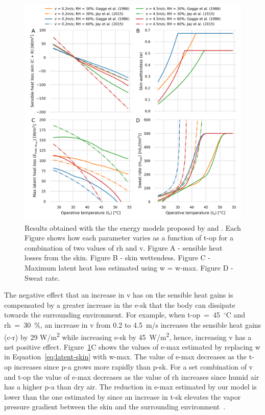 \begin{figure}[thb!]
    \centering
    \includegraphics[width=\textwidth]{figures/comparison_models_v2.png}
    \caption{Results obtained with the the energy models proposed by  and .
    Each Figure shows how each parameter varies as a function of \ac{t-op} for a combination of two values of \ac{rh} and \ac{v}.
    Figure A - sensible heat losses from the skin.
    Figure B - skin wettendess.
    Figure C - Maximum latent heat loss estimated using \ac{w} = \ac{w-max}.
    Figure D - Sweat rate.}
    \label{fig:comparison_models}
\end{figure}

The negative effect that an increase in \ac{v} has on the sensible heat gains is compensated by a greater increase in the \acf{e-sk} that the body can dissipate towards the surrounding environment.
For example, when \ac{t-op}~=~45~$^{\circ}$C and \ac{rh}~=~30~\%, an increase in \ac{v} from 0.2 to 4.5~m/s increases the sensible heat gains (\acs{c-r}) by 29 W/m\textsuperscript{2} while increasing \ac{e-sk} by 45~W/m\textsuperscript{2}, hence, increasing \ac{v} has a net positive effect.
Figure~\ref{fig:comparison_models}C shows the values of \ac{e-max} estimated by replacing \ac{w} in Equation~\ref{eq:latent-skin} with \ac{w-max}.
The value of \ac{e-max} decreases as the \ac{t-op} increases since \ac{p-a} grows more rapidly than \ac{p-sk}.
For a set combination of \ac{v} and \ac{t-op} the value of \ac{e-max} decreases as the value of \ac{rh} increases since humid air has a higher \ac{p-a} than dry air.
The reduction in \ac{e-max} estimated by our model is lower than the one estimated by  since an increase in \ac{t-sk} elevates the vapor pressure gradient between the skin and the surrounding environment~\cite{VanSomeren2011}.

